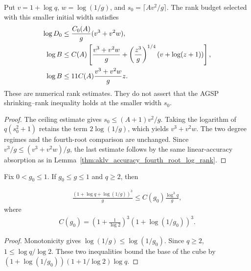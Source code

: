 \begin{lemma}
    \label{thm:aklv_separated_log_rank_budget}
    \leanok
    Put $v=1+\log q$, $w=\log(1/g)$, and
    $s_0=\lceil Av^2/g\rceil$.  The rank budget selected with this smaller
    initial width satisfies
    \begin{align*}
        \log D_0 & \le \frac{C_0(A)}{g}(v^3+v^2w),\notag \\
        \log B   & \le C(A)\left[
            \frac{v^3+v^2w}{g}
            +\left(\frac{z^3}{g}\right)^{1/4}
        (v+\log(z+1))\right],\notag                      \\
        \log B   & \le 11C(A)\frac{v^3+v^2w}{g}z.
    \end{align*}
    These are numerical rank estimates.  They do not assert that the AGSP
    shrinking--rank inequality holds at the smaller width $s_0$.
\end{lemma}
\begin{proof}
    \leanok
    The ceiling estimate gives $s_0\le(A+1)v^2/g$.  Taking the logarithm of
    $q(s_0^2+1)$ retains the term $2\log(1/g)$, which yields
    $v^3+v^2w$.  The two degree regimes and the fourth-root comparison are
    unchanged.  Since $v^3/g\le(v^3+v^2w)/g$, the last estimate follows by
    the same linear-accuracy absorption as in
    Lemma~\ref{thm:aklv_accuracy_fourth_root_log_rank}.
\end{proof}

\begin{lemma}
    \label{thm:aklv_fixed_gap_cubic_cost}
    \leanok
    Fix $0<g_0\le1$.  If $g_0\le g\le1$ and $q\ge2$, then

    \begin{align*}
        \frac{(1+\log q+\log(1/g))^3}{g}
        \le C(g_0)\frac{\log^3q}{g},
    \end{align*}
    where
    \begin{align*}
        C(g_0)=\left(1+\frac1{\log2}\right)^3
        \left(1+\log(1/g_0)\right)^3.
    \end{align*}
\end{lemma}
\begin{proof}
    \leanok
    Monotonicity gives $\log(1/g)\le\log(1/g_0)$.  Since $q\ge2$,
    $1\le\log q/\log2$.  These two inequalities bound the base of the
    cube by
    $(1+\log(1/g_0))(1+1/\log2)\log q$.
\end{proof}

